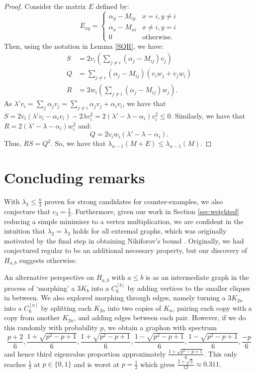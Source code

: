 \documentclass[12pt]{article}
\begin{document}
\begin{proof} Consider the matrix $E$ defined by:
\begin{equation*}
    E_{xy} = \begin{cases} \alpha_{y} - M_{iy} & x=i, y\ne i \\ \alpha_{x} - M_{xi} & x\ne i,y=i \\ 0 &\text{otherwise.} \end{cases}
\end{equation*}
Then, using the notation in Lemma \ref{SQR}, we have:
\begin{align*}
    S &= 2v_i\left(\sum_{j\ne i} (\alpha_{j} - M_{ij}) v_j\right) \\
    Q &= \sum_{j\ne i} (\alpha_{j} - M_{ij}) (v_iw_j + v_jw_i) \\
    R &= 2w_i\left(\sum_{j\ne i} (\alpha_{j} - M_{ij}) w_j\right).
\end{align*}
As $\lambda' v_i = \sum_{j} \alpha_{j} v_j = \sum_{j\ne i} \alpha_{j} v_j + \alpha_i v_i$, we have that $S = 2v_i(\lambda'v_i - \alpha_i v_i) - 2\lambda v_i^2 = 2(\lambda' - \lambda - \alpha_i)v_i^2 \le 0$. Similarly, we have that $R = 2(\lambda' - \lambda - \alpha_i)w_i^2$ and:
\begin{equation*}
    Q = 2v_iw_i(\lambda' - \lambda - \alpha_i).
\end{equation*}
Thus, $RS = Q^2$. So, we have that $\lambda_{n-1}(M+E) \le \lambda_{n-1}(M)$. 
\end{proof}

\section{Concluding remarks}

With $\lambda_3 \le \frac{n}{3}$ proven for strong candidates for counter-examples, we also conjecture that $c_3 = \frac13$. Furthermore, given our work in Section \ref{sec:weighted} reducing a simple minimiser to a vertex multiplication, we are confident in the intuition that $\lambda_2 = \lambda_3$ holds for all extremal graphs, which was originally motivated by the final step in obtaining Nikiforov's bound \cite{NikiforovEvals}. Originally, we had conjectured regular to be an additional necessary property, but our discovery of $H_{a,b}$ suggests otherwise. 

An alternative perspective on $H_{a,b}$ with $a \le b$ is as an intermediate graph in the process of `morphing' a $3K_b$ into a $C_6^{[b]}$ by adding vertices to the smaller cliques in between. We also explored morphing through edges, namely turning a $3K_{2n}$ into a $C_6^{[n]}$ by splitting each $K_{2n}$ into two copies of $K_n$, pairing each copy with a copy from another $K_{2n}$, and adding edges between each pair. However, if we do this randomly with probability $p$, we obtain a graphon with spectrum 
\[\frac{p+2}{6}, \frac{1 + \sqrt{p^2 - p + 1}}{6}, \frac{1 + \sqrt{p^2 - p + 1}}{6}, \frac{1 - \sqrt{p^2 - p + 1}}{6}, \frac{1 - \sqrt{p^2 - p + 1}}{6}, \frac{-p}{6}\]
and hence third eigenvalue proportion approximately $\frac{1 + \sqrt{p^2 - p + 1}}{6}$. This only reaches $\frac13$ at $p \in \{0, 1\}$ and is worst at $p = \frac12$ which gives $\frac{2+\sqrt{3}}{12} \approx 0.311$. 
\end{document}
